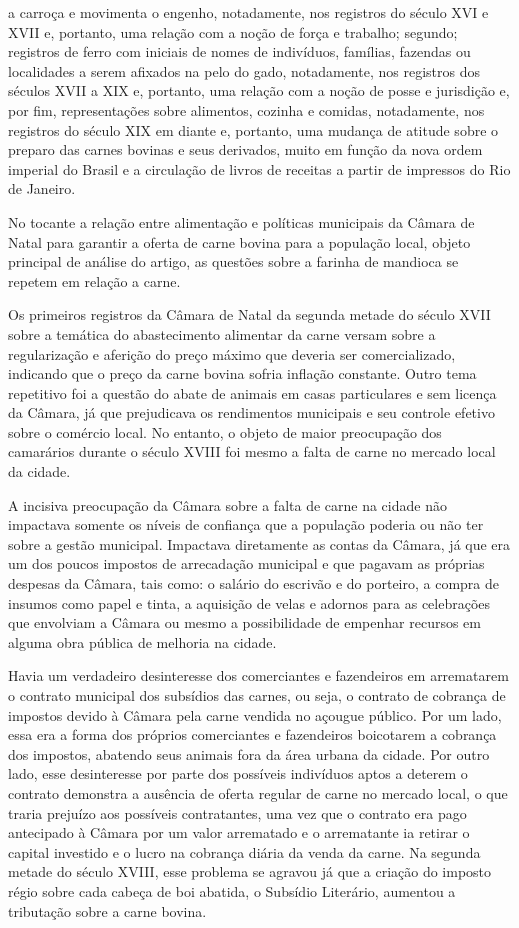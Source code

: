 \begin{refsection}
a carroça e movimenta o engenho, notadamente, nos registros do século XVI e XVII e, portanto, uma relação com a noção de força e trabalho; segundo; registros de ferro com iniciais de nomes de indivíduos, famílias, fazendas ou localidades a serem afixados na pelo do gado, notadamente, nos registros dos séculos XVII a XIX e, portanto, uma relação com a noção de posse e jurisdição e, por fim, representações sobre alimentos, cozinha e comidas, notadamente, nos registros do século XIX em diante e, portanto, uma mudança de atitude sobre o preparo das carnes bovinas e seus derivados, muito em função da nova ordem imperial do Brasil e a circulação de livros de receitas a partir de impressos do Rio de Janeiro.

No tocante a relação entre alimentação e políticas municipais da Câmara de Natal para garantir a oferta de carne bovina para a população local, objeto principal de análise do artigo, as questões sobre a farinha de mandioca se repetem em relação a carne.

Os primeiros registros da Câmara de Natal da segunda metade do século XVII sobre a temática do abastecimento alimentar da carne versam sobre a regularização e aferição do preço máximo que deveria ser comercializado, indicando que o preço da carne bovina sofria inflação constante. Outro tema repetitivo foi a questão do abate de animais em casas particulares e sem licença da Câmara, já que prejudicava os rendimentos municipais e seu controle efetivo sobre o comércio local. No entanto, o objeto de maior preocupação dos camarários durante o século XVIII foi mesmo a falta de carne no mercado local da cidade.

A incisiva preocupação da Câmara sobre a falta de carne na cidade não impactava somente os níveis de confiança que a população poderia ou não ter sobre a gestão municipal. Impactava diretamente as contas da Câmara, já que era um dos poucos impostos de arrecadação municipal e que pagavam as próprias despesas da Câmara, tais como: o salário do escrivão e do porteiro, a compra de insumos como papel e tinta, a aquisição de velas e adornos para as celebrações que envolviam a Câmara ou mesmo a possibilidade de empenhar recursos em alguma obra pública de melhoria na cidade.

Havia um verdadeiro desinteresse dos comerciantes e fazendeiros em arrematarem o contrato municipal dos subsídios das carnes, ou seja, o contrato de cobrança de impostos devido à Câmara pela carne vendida no açougue público. Por um lado, essa era a forma dos próprios comerciantes e fazendeiros boicotarem a cobrança dos impostos, abatendo seus animais fora da área urbana da cidade. Por outro lado, esse desinteresse por parte dos possíveis indivíduos aptos a deterem o contrato demonstra a ausência de oferta regular de carne no mercado local, o que traria prejuízo aos possíveis contratantes, uma vez que o contrato era pago antecipado à Câmara por um valor arrematado e o arrematante ia retirar o capital investido e o lucro na cobrança diária da venda da carne. Na segunda metade do século XVIII, esse problema se agravou já que a criação do imposto régio sobre cada cabeça de boi abatida, o Subsídio Literário, aumentou a tributação sobre a carne bovina.


\end{refsection}
